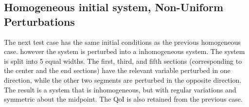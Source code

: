 \documentclass{article}
\begin{document}
\subsection{Homogeneous initial system, Non-Uniform Perturbations}

The next test case has the same initial conditions as the previous homogeneous case. however the system is perturbed into a inhomogeneous system. The system is split into 5 equal widths. The first, third, and fifth sections (corresponding to the center and the end sections) have the relevant variable perturbed in one direction, while the other two segments are perturbed in the opposite direction. The result is a system that is inhomogeneous, but with regular variations and symmetric about the midpoint. The QoI is also retained from the previous case.
\end{document}
